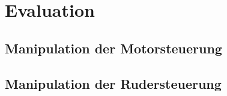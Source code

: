 \chapter{Evaluation}

\section{Manipulation der Motorsteuerung}

\section{Manipulation der Rudersteuerung}